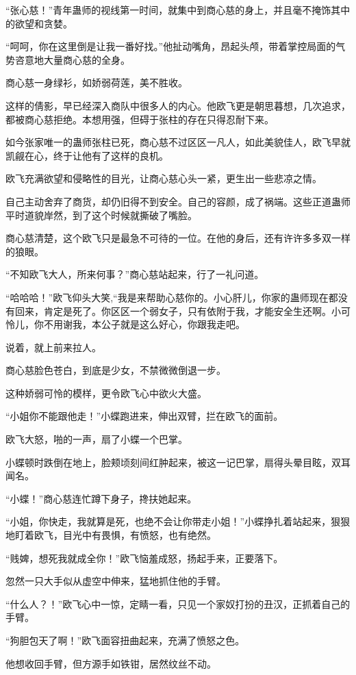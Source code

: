 \begin{this_body}
“张心慈！”青年蛊师的视线第一时间，就集中到商心慈的身上，并且毫不掩饰其中的欲望和贪婪。

“呵呵，你在这里倒是让我一番好找。”他扯动嘴角，昂起头颅，带着掌控局面的气势咨意地大量商心慈的全身。

商心慈一身绿衫，如娇弱荷莲，美不胜收。

这样的倩影，早已经深入商队中很多人的内心。他欧飞更是朝思暮想，几次追求，都被商心慈拒绝。本想用强，但碍于张柱的存在只得忍耐下来。

如今张家唯一的蛊师张柱已死，商心慈不过区区一凡人，如此美貌佳人，欧飞早就凯觎在心，终于让他有了这样的良机。

欧飞充满欲望和侵略性的目光，让商心慈心头一紧，更生出一些悲凉之情。

自己主动舍弃了商货，却仍旧得不到安全。自己的容颜，成了祸端。这些正道蛊师平时道貌岸然，到了这个时候就撕破了嘴脸。

商心慈清楚，这个欧飞只是最急不可待的一位。在他的身后，还有许许多多双一样的狼眼。

“不知欧飞大人，所来何事？”商心慈站起来，行了一礼问道。

“哈哈哈！”欧飞仰头大笑,“我是来帮助心慈你的。小心肝儿，你家的蛊师现在都没有回来，肯定是死了。你区区一个弱女子，只有依附于我，才能安全生还啊。小可怜儿，你不用谢我，本公子就是这么好心，你跟我走吧。

说着，就上前来拉人。

商心慈脸色苍白，到底是少女，不禁微微倒退一步。

这种娇弱可怜的模样，更令欧飞心中欲火大盛。

“小姐你不能跟他走！”小蝶跑进来，伸出双臂，拦在欧飞的面前。

欧飞大怒，啪的一声，扇了小蝶一个巴掌。

小蝶顿时跌倒在地上，脸颊顷刻间红肿起来，被这一记巴掌，扇得头晕目眩，双耳闻名。

“小蝶！”商心慈连忙蹲下身子，搀扶她起来。

“小姐，你快走，我就算是死，也绝不会让你带走小姐！”小蝶挣扎着站起来，狠狠地盯着欧飞，目光中有畏惧，有愤怒，也有绝然。

“贱婢，想死我就成全你！”欧飞恼羞成怒，扬起手来，正要落下。

忽然一只大手似从虚空中伸来，猛地抓住他的手臂。

“什么人？！”欧飞心中一惊，定睛一看，只见一个家奴打扮的丑汉，正抓着自己的手臂。

“狗胆包天了啊！”欧飞面容扭曲起来，充满了愤怒之色。

他想收回手臂，但方源手如铁钳，居然纹丝不动。


\end{this_body}
